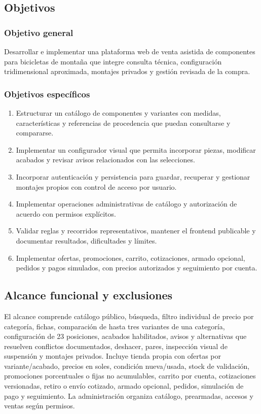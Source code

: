 \documentclass[12pt,letterpaper]{article}
\begin{document}
\subsection{Objetivos}
\subsubsection{Objetivo general}
Desarrollar e implementar una plataforma web de venta asistida de componentes para bicicletas de montaña que integre consulta técnica, configuración tridimensional aproximada, montajes privados y gestión revisada de la compra.

\subsubsection{Objetivos específicos}
\begin{enumerate}[label=OE\arabic*.]
\item Estructurar un catálogo de componentes y variantes con medidas, características y referencias de procedencia que puedan consultarse y compararse.
\item Implementar un configurador visual que permita incorporar piezas, modificar acabados y revisar avisos relacionados con las selecciones.
\item Incorporar autenticación y persistencia para guardar, recuperar y gestionar montajes propios con control de acceso por usuario.
\item Implementar operaciones administrativas de catálogo y autorización de acuerdo con permisos explícitos.
\item Validar reglas y recorridos representativos, mantener el frontend publicable y documentar resultados, dificultades y límites.
\item Implementar ofertas, promociones, carrito, cotizaciones, armado opcional, pedidos y pagos simulados, con precios autorizados y seguimiento por cuenta.
\end{enumerate}

\subsection{Alcance funcional y exclusiones}
El alcance comprende catálogo público, búsqueda, filtro individual de precio por categoría, fichas, comparación de hasta tres variantes de una categoría, configuración de 23 posiciones, acabados habilitados, avisos y alternativas que resuelven conflictos documentados, deshacer, pares, inspección visual de suspensión y montajes privados. Incluye tienda propia con ofertas por variante/acabado, precios en soles, condición nueva/usada, stock de validación, promociones porcentuales o fijas no acumulables, carrito por cuenta, cotizaciones versionadas, retiro o envío cotizado, armado opcional, pedidos, simulación de pago y seguimiento. La administración organiza catálogo, prearmadas, accesos y ventas según permisos.
\end{document}
